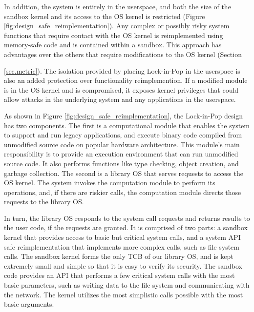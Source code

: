 In addition, the system is entirely in the userspace, and both the size of
 the sandbox kernel and its access to the OS kernel is restricted
(Figure \ref{fig:design_safe_reimplementation}). Any complex or possibly risky system
functions that require contact with the OS kernel is reimplemented using
memory-safe code and is contained within a sandbox. This approach has advantages
over the others that require modifications to
the OS kernel (Section {\ref{sec.metric}). The isolation provided by placing
Lock-in-Pop in the userspace is also an added protection over functionality
reimplemention. If a modified module is in the OS kernel and is compromised, it
exposes kernel privileges that could allow attacks 
in the underlying system and any applications in the userspace.


As shown in Figure \ref{fig:design_safe_reimplementation}, the Lock-in-Pop design
has two components. The first is a computational module that enables the system to
support and run legacy applications, and execute binary code compiled from unmodified
source code on popular hardware architecture. This module's main responsibility is
to provide an execution environment that can run unmodified source code. It also
performs functions like type checking, object creation, and garbage collection.
The second is a library OS that serves requests to access the OS kernel.
The system invokes the computation module to perform its operations,
and, if there are riskier calls, the computation module directs those requests to the
library OS.

In turn, the library OS responds to the system call requests and
returns results to the user code, if the requests are granted.
It is comprised of two parts: a sandbox kernel that provides access to basic but critical
system calls, and a system API safe reimplementation that implements more
complex calls, such as file system calls. 
%
The sandbox kernel forms the only TCB of our library OS, and is kept
extremely small and simple so that it is easy to verify its security.
The sandbox code provides an API that performs a few critical system calls with
the most basic parameters, such as writing data to the file system
and communicating with the network. The kernel utilizes the most simplistic calls
possible with the most basic arguments. 

}
